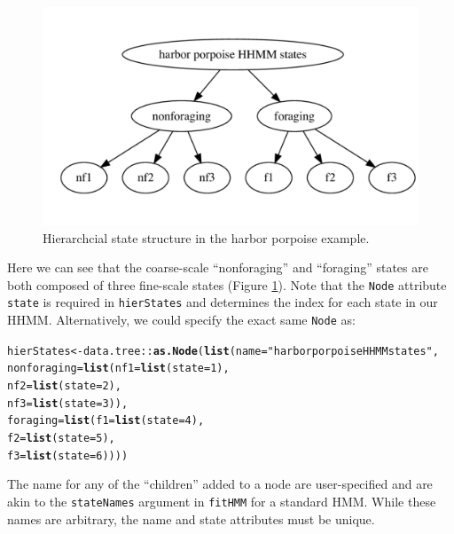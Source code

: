 \documentclass[12pt]{article}\usepackage[]{graphicx}\usepackage[]{color}
\makeatletter
\newcommand{\hlnum}[1]{\textcolor[rgb]{0.686,0.059,0.569}{#1}}%
\newcommand{\hlstr}[1]{\textcolor[rgb]{0.192,0.494,0.8}{#1}}%
\newcommand{\hlopt}[1]{\textcolor[rgb]{0,0,0}{#1}}%
\newcommand{\hlstd}[1]{\textcolor[rgb]{0.345,0.345,0.345}{#1}}%
\newcommand{\hlkwb}[1]{\textcolor[rgb]{0.69,0.353,0.396}{#1}}%
\newcommand{\hlkwc}[1]{\textcolor[rgb]{0.333,0.667,0.333}{#1}}%
\newcommand{\hlkwd}[1]{\textcolor[rgb]{0.737,0.353,0.396}{\textbf{#1}}}%
\newenvironment{kframe}{%
 \def\at@end@of@kframe{}%
 \ifinner\ifhmode%
  \def\at@end@of@kframe{\end{minipage}}%
  \begin{minipage}{\columnwidth}%
 \fi\fi%
 \def\FrameCommand##1{\hskip\@totalleftmargin \hskip-\fboxsep
 \colorbox{shadecolor}{##1}\hskip-\fboxsep
     \hskip-\linewidth \hskip-\@totalleftmargin \hskip\columnwidth}%
 \MakeFramed {\advance\hsize-\width
   \@totalleftmargin\z@ \linewidth\hsize
   \@setminipage}}%
 {\par\unskip\endMakeFramed%
 \at@end@of@kframe}
\newenvironment{knitrout}{}{} %
\makeatother
\begin{document}
\begin{figure}[htbp]
  \centering
  \includegraphics[width=\textwidth]{harborPorpoiseStates.pdf}
  \caption{Hierarchcial state structure in the harbor porpoise example.}
  \label{fig:harborPorpoiseStates}
\end{figure}
\noindent Here we can see that the coarse-scale ``nonforaging'' and ``foraging'' states are both composed of three fine-scale states (Figure \ref{fig:harborPorpoiseStates}). Note that the \verb|Node| attribute \verb|state| is required in \verb|hierStates| and determines the index for each state in our HHMM. Alternatively, we could specify the exact same \verb|Node| as:
\begin{knitrout}
\color{fgcolor}\begin{kframe}
\begin{alltt}
\hlstd{hierStates} \hlkwb{<-} \hlstd{data.tree}\hlopt{::}\hlkwd{as.Node}\hlstd{(}\hlkwd{list}\hlstd{(}\hlkwc{name}\hlstd{=}\hlstr{"harbor porpoise HHMM states"}\hlstd{,}
                                      \hlkwc{nonforaging}\hlstd{=}\hlkwd{list}\hlstd{(}\hlkwc{nf1}\hlstd{=}\hlkwd{list}\hlstd{(}\hlkwc{state}\hlstd{=}\hlnum{1}\hlstd{),}
                                                       \hlkwc{nf2}\hlstd{=}\hlkwd{list}\hlstd{(}\hlkwc{state}\hlstd{=}\hlnum{2}\hlstd{),}
                                                       \hlkwc{nf3}\hlstd{=}\hlkwd{list}\hlstd{(}\hlkwc{state}\hlstd{=}\hlnum{3}\hlstd{)),}
                                      \hlkwc{foraging}\hlstd{=}\hlkwd{list}\hlstd{(}\hlkwc{f1}\hlstd{=}\hlkwd{list}\hlstd{(}\hlkwc{state}\hlstd{=}\hlnum{4}\hlstd{),}
                                                    \hlkwc{f2}\hlstd{=}\hlkwd{list}\hlstd{(}\hlkwc{state}\hlstd{=}\hlnum{5}\hlstd{),}
                                                    \hlkwc{f3}\hlstd{=}\hlkwd{list}\hlstd{(}\hlkwc{state}\hlstd{=}\hlnum{6}\hlstd{))))}
\end{alltt}
\end{kframe}
\end{knitrout}
\noindent The name for any of the ``children'' added to a node are user-specified and are akin to the \verb|stateNames| argument in \verb|fitHMM| for a standard HMM.  While these names are arbitrary, the name and state attributes must be unique.
\end{document}
